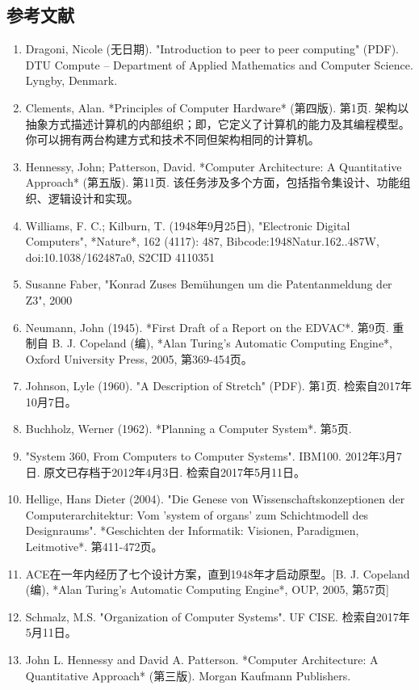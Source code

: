 \subsection{参考文献}  
\begin{enumerate}
\item Dragoni, Nicole (无日期). "Introduction to peer to peer computing" (PDF). DTU Compute – Department of Applied Mathematics and Computer Science. Lyngby, Denmark.  
\item Clements, Alan. *Principles of Computer Hardware* (第四版). 第1页. 架构以抽象方式描述计算机的内部组织；即，它定义了计算机的能力及其编程模型。你可以拥有两台构建方式和技术不同但架构相同的计算机。  
\item Hennessy, John; Patterson, David. *Computer Architecture: A Quantitative Approach* (第五版). 第11页. 该任务涉及多个方面，包括指令集设计、功能组织、逻辑设计和实现。  
\item Williams, F. C.; Kilburn, T. (1948年9月25日), "Electronic Digital Computers", *Nature*, 162 (4117): 487, Bibcode:1948Natur.162..487W, doi:10.1038/162487a0, S2CID 4110351  
\item Susanne Faber, "Konrad Zuses Bemühungen um die Patentanmeldung der Z3", 2000  
\item Neumann, John (1945). *First Draft of a Report on the EDVAC*. 第9页.  
  重制自 B. J. Copeland (编), *Alan Turing's Automatic Computing Engine*, Oxford University Press, 2005, 第369-454页。  
\item Johnson, Lyle (1960). "A Description of Stretch" (PDF). 第1页. 检索自2017年10月7日。  
\item Buchholz, Werner (1962). *Planning a Computer System*. 第5页.  
\item "System 360, From Computers to Computer Systems". IBM100. 2012年3月7日. 原文已存档于2012年4月3日. 检索自2017年5月11日。  
\item Hellige, Hans Dieter (2004). "Die Genese von Wissenschaftskonzeptionen der Computerarchitektur: Vom 'system of organs' zum Schichtmodell des Designraums". *Geschichten der Informatik: Visionen, Paradigmen, Leitmotive*. 第411-472页。  
\item ACE在一年内经历了七个设计方案，直到1948年才启动原型。[B. J. Copeland (编), *Alan Turing's Automatic Computing Engine*, OUP, 2005, 第57页]  
\item Schmalz, M.S. "Organization of Computer Systems". UF CISE. 检索自2017年5月11日。  
\item John L. Hennessy and David A. Patterson. *Computer Architecture: A Quantitative Approach* (第三版). Morgan Kaufmann Publishers.  

\end{enumerate}
